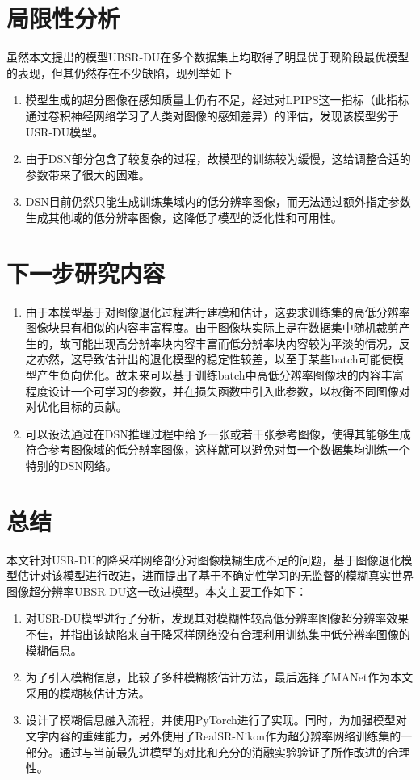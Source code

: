 \section{局限性分析}
虽然本文提出的模型UBSR-DU在多个数据集上均取得了明显优于现阶段最优模型的表现，但其仍然存在不少缺陷，现列举如下
\begin{enumerate}
    \item 模型生成的超分图像在感知质量上仍有不足，经过对LPIPS这一指标（此指标通过卷积神经网络学习了人类对图像的感知差异）的评估，发现该模型劣于USR-DU模型。
    \item 由于DSN部分包含了较复杂的过程，故模型的训练较为缓慢，这给调整合适的参数带来了很大的困难。
    \item DSN目前仍然只能生成训练集域内的低分辨率图像，而无法通过额外指定参数生成其他域的低分辨率图像，这降低了模型的泛化性和可用性。
\end{enumerate}
\section{下一步研究内容}
\begin{enumerate}
    \item 由于本模型基于对图像退化过程进行建模和估计，这要求训练集的高低分辨率图像块具有相似的内容丰富程度。由于图像块实际上是在数据集中随机裁剪产生的，故可能出现高分辨率块内容丰富而低分辨率块内容较为平淡的情况，反之亦然，这导致估计出的退化模型的稳定性较差，以至于某些batch可能使模型产生负向优化。故未来可以基于训练batch中高低分辨率图像块的内容丰富程度设计一个可学习的参数，并在损失函数中引入此参数，以权衡不同图像对对优化目标的贡献。
    \item 可以设法通过在DSN推理过程中给予一张或若干张参考图像，使得其能够生成符合参考图像域的低分辨率图像，这样就可以避免对每一个数据集均训练一个特别的DSN网络。
\end{enumerate}
\section{总结}
本文针对USR-DU的降采样网络部分对图像模糊生成不足的问题，基于图像退化模型估计对该模型进行改进，进而提出了基于不确定性学习的无监督的模糊真实世界图像超分辨率UBSR-DU这一改进模型。本文主要工作如下：
\begin{enumerate}
    \item 对USR-DU模型进行了分析，发现其对模糊性较高低分辨率图像超分辨率效果不佳，并指出该缺陷来自于降采样网络没有合理利用训练集中低分辨率图像的模糊信息。
    \item 为了引入模糊信息，比较了多种模糊核估计方法，最后选择了MANet作为本文采用的模糊核估计方法。
    \item 设计了模糊信息融入流程，并使用PyTorch进行了实现。同时，为加强模型对文字内容的重建能力，另外使用了RealSR-Nikon作为超分辨率网络训练集的一部分。通过与当前最先进模型的对比和充分的消融实验验证了所作改进的合理性。
\end{enumerate}